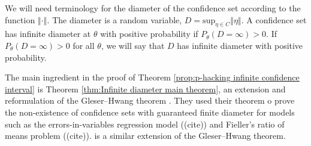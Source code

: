 \documentclass[twoside]{article}
\begin{document}
We will need terminology for the diameter of the confidence set according
to the function $\left\Vert \cdot\right\Vert $. The diameter is
a random variable, $D=\textrm{sup}_{\eta\in C}\left\Vert \eta\right\Vert $.
A confidence set has infinite diameter at $\theta$ with positive
probability if $P_{\theta}(D=\infty)>0$. If $P_{\theta}(D=\infty)>0$
for all $\theta$, we will say that $D$ has infinite diameter with
positive probability.

The main ingredient in the proof of Theorem \ref{prop:p-hacking infinite confidence interval}
is Theorem \ref{thm:Infinite diameter main theorem}, an extension
and reformulation of the Gleser--Hwang theorem \citep{gleser1987nonexistence}. 
They used their theorem o prove the non-existence of confidence sets with
guaranteed finite diameter for models such as the errors-in-variables
regression model ((cite)) and Fieller's ratio of means problem ((cite)). \citet[theorem 1]{berger1999integrated}
is a similar extension of the Gleser--Hwang theorem.
\end{document}

